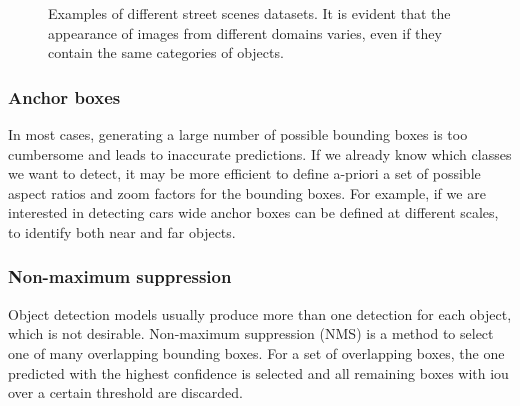 \documentclass[%
    corpo=12pt,
    twoside,
    stile=classica,   
    tipotesi=magistrale,
    evenboxes,
    english
]{toptesi}
\begin{document}
\begin{figure}[ht]
	\centering
	\caption{Examples of different street scenes datasets. It is evident that the appearance of images from different domains varies, even if they contain the same categories of objects.}
	\label{fig:datasets}
\end{figure}

\subsubsection{Anchor boxes}\label{sec:anchor}
In most cases, generating a large number of possible bounding boxes is too cumbersome and leads to inaccurate predictions. If we already know which classes we want to detect, it may be more efficient to define a-priori a set of possible aspect ratios and zoom factors for the bounding boxes. For example, if we are interested in detecting cars wide anchor boxes can be defined at different scales, to identify both near and far objects.

\subsubsection{Non-maximum suppression}
Object detection models usually produce more than one detection for each object, which is not desirable. Non-maximum suppression (NMS) is a method to select one of many overlapping bounding boxes. For a set of overlapping boxes, the one predicted with the highest confidence is selected and all remaining boxes with \gls{iou} over a certain threshold are discarded.
\end{document}
